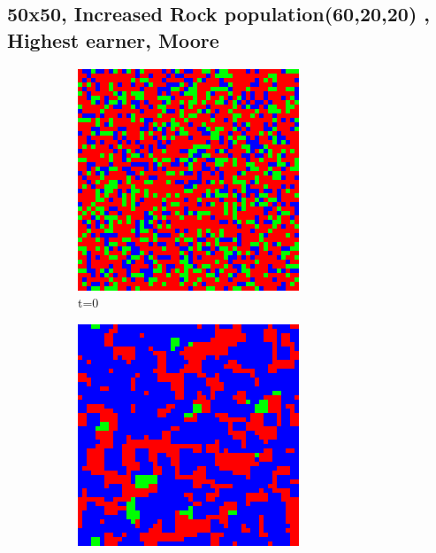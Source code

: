 \documentclass[a4paper, 11pt]{article}
\begin{document}
\newpage
\begin{landscape}
\subsection{50x50, Increased Rock population(60,20,20) , Highest earner, Moore}

\begin{figure}[H]
\centering
\begin{subfigure}{.20\textwidth}
  \centering
  \includegraphics[width=0.95\linewidth]{ROCK_PAPER_SCISSORS_MOORE_50x50_HighRockPop60_t00}
  \caption{t=0}
\end{subfigure}%
\begin{subfigure}{.20\textwidth}
  \centering
  \includegraphics[width=0.95\linewidth]{ROCK_PAPER_SCISSORS_MOORE_50x50_HighRockPop60_t01}

\end{subfigure}
\end{figure}
\end{landscape}
\end{document}
